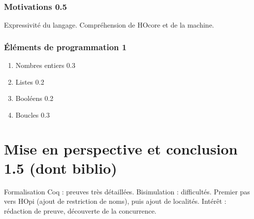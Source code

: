 \documentclass[11pt]{article}
\newcounter{c_theo}
\newcounter{c_def}
\begin{document}
\subsubsection{Motivations 0.5}
\label{sec-4-2-1}
Expressivité du langage.
Compréhension de HOcore et de la machine.
\subsubsection{Éléments de programmation 1}
\label{sec-4-2-2}
\begin{enumerate}
\item Nombres entiers 0.3
\label{sec-4-2-2-1}
\item Listes 0.2
\label{sec-4-2-2-2}
\item Booléens 0.2
\label{sec-4-2-2-3}
\item Boucles 0.3
\label{sec-4-2-2-4}
\end{enumerate}


\section{Mise en perspective et conclusion 1.5 (dont biblio)}
\label{sec-5}
Formalisation Coq : preuves très détaillées.
Bisimulation : difficultés.
Premier pas vers HOpi (ajout de restriction de noms), puis ajout de localités.
Intérêt : rédaction de preuve, découverte de la concurrence.




\end{document}
